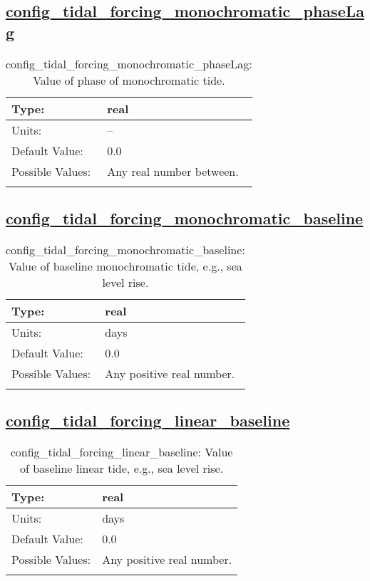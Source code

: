 \subsection[config\_tidal\_forcing\_monochromatic\_phaseLag]{\hyperref[sec:nm_tab_tidal_forcing]{config\_tidal\_forcing\_monochromatic\_phaseLag}}
\label{subsec:nm_sec_config_tidal_forcing_monochromatic_phaseLag}
\begin{center}
\begin{longtable}{| p{2.0in} || p{4.0in} |}
    \hline
    Type: & real \\
    \hline
    Units: & -- \\
    \hline
    Default Value: & 0.0 \\
    \hline
    Possible Values: & Any real number between. \\
    \hline
    \caption{config\_tidal\_forcing\_monochromatic\_phaseLag: Value of phase of monochromatic tide.}
\end{longtable}
\end{center}
\subsection[config\_tidal\_forcing\_monochromatic\_baseline]{\hyperref[sec:nm_tab_tidal_forcing]{config\_tidal\_forcing\_monochromatic\_baseline}}
\label{subsec:nm_sec_config_tidal_forcing_monochromatic_baseline}
\begin{center}
\begin{longtable}{| p{2.0in} || p{4.0in} |}
    \hline
    Type: & real \\
    \hline
    Units: & \si{days} \\
    \hline
    Default Value: & 0.0 \\
    \hline
    Possible Values: & Any positive real number. \\
    \hline
    \caption{config\_tidal\_forcing\_monochromatic\_baseline: Value of baseline monochromatic tide, e.g., sea level rise.}
\end{longtable}
\end{center}
\subsection[config\_tidal\_forcing\_linear\_baseline]{\hyperref[sec:nm_tab_tidal_forcing]{config\_tidal\_forcing\_linear\_baseline}}
\label{subsec:nm_sec_config_tidal_forcing_linear_baseline}
\begin{center}
\begin{longtable}{| p{2.0in} || p{4.0in} |}
    \hline
    Type: & real \\
    \hline
    Units: & \si{days} \\
    \hline
    Default Value: & 0.0 \\
    \hline
    Possible Values: & Any positive real number. \\
    \hline
    \caption{config\_tidal\_forcing\_linear\_baseline: Value of baseline linear tide, e.g., sea level rise.}
\end{longtable}
\end{center}

